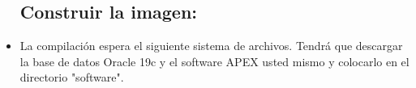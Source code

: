 \begin{itemize}
 \subsection{Construir la imagen:}
	\item La compilación espera el siguiente sistema de archivos. Tendrá que descargar la base de datos Oracle 19c y el software APEX usted mismo y colocarlo en el directorio "software".
                  

\end{itemize}







